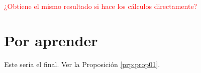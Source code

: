 \documentclass[
]{krantz}
\theoremstyle{definition}
\theoremstyle{definition}
\theoremstyle{definition}
\theoremstyle{definition}
\theoremstyle{remark}
\begin{document}
\bigskip

\textcolor{red}{¿Obtiene el mismo resultado si hace los cálculos directamente?}

\cleardoublepage

\hypertarget{appendix-apuxe9ndice-de-prueba}{%
\appendix {}}


\hypertarget{por-aprender}{%
\chapter{Por aprender}\label{por-aprender}}

Este sería el final. Ver la Proposición \ref{prp:prop01}.

  

\backmatter
\printindex
\end{document}
